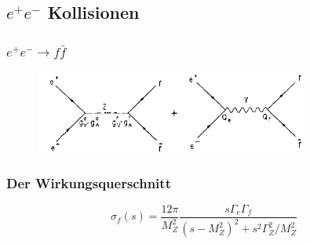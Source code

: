 \subsection{$e^+e^-$ Kollisionen}
\begin{frame}
	\frametitle{$e^+e^- \rightarrow f\bar{f}$ }
	\begin{center}
		\begin{figure}
			\includegraphics[width=0.8\textwidth]{graphics/annihilation.png}
		\end{figure}
	\end{center}
\end{frame}
\begin{frame}
	\frametitle{Der Wirkungsquerschnitt}
	\begin{center}
		\begin{equation*}
		\sigma_f(s) = \frac{12\pi}{M_Z^2} \frac{s\Gamma_e\Gamma_f}{(s-M_Z^2)^2+s^2\Gamma_Z^2/M_Z^2}
		\end{equation*}
	\end{center}
\end{frame}

